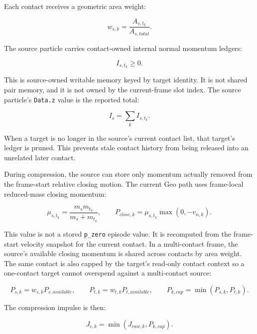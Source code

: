 Each contact receives a geometric area weight:

\begin{equation}
w_{s,k} =
\frac{A_{s,t_k}}{A_{s,total}}.
\end{equation}

The source particle carries contact-owned internal normal momentum ledgers:

\begin{equation}
I_{s,t_k} \ge 0.
\end{equation}

This is source-owned writable memory keyed by target identity.  It is not
shared pair memory, and it is not owned by the current-frame slot index.  The
source particle's \texttt{Data.z} value is the reported total:

\begin{equation}
I_s = \sum_k I_{s,t_k}.
\end{equation}

When a target is no longer in the source's current contact list, that target's
ledger is pruned.  This prevents stale contact history from being released
into an unrelated later contact.

During compression, the source can store only momentum actually removed from
the frame-start relative closing motion.  The current Geo path uses
frame-local reduced-mass closing momentum:

\begin{equation}
\mu_{s,t_k} =
\frac{m_s m_{t_k}}{m_s + m_{t_k}},
\qquad
P_{close,k} =
\mu_{s,t_k}\max(0,-v_{n,k}).
\end{equation}

This value is not a stored \texttt{p\_zero} episode value.  It is recomputed
from the frame-start velocity snapshot for the current contact.  In a
multi-contact frame, the source's available closing momentum is shared across
contacts by area weight.  The same contact is also capped by the target's
read-only contact context so a one-contact target cannot overspend against a
multi-contact source:

\begin{equation}
P_{s,k} = w_{s,k} P_{s,available},
\qquad
P_{t,k} = w_{t,k} P_{t,available},
\qquad
P_{k,cap} = \min(P_{s,k}, P_{t,k}).
\end{equation}

The compression impulse is then:

\begin{equation}
J_{c,k} = \min\left(J_{raw,k}, P_{k,cap}\right).
\end{equation}

